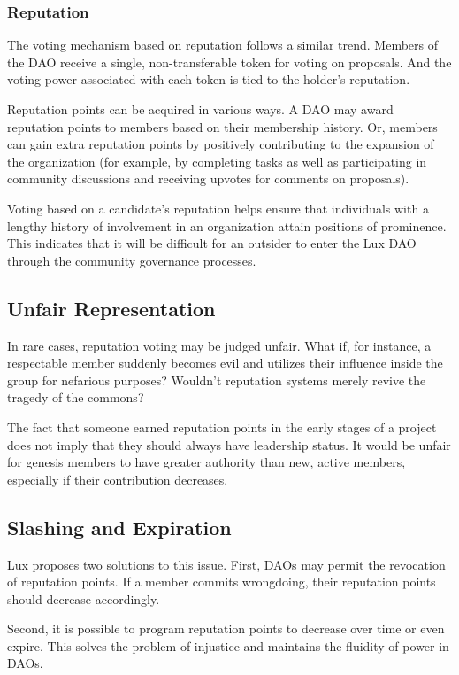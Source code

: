 \documentclass[11pt]{article}
\begin{document}
\subsubsection{Reputation}

The voting mechanism based on reputation follows a similar trend. Members of the DAO receive a single, non-transferable token for voting on proposals. And the voting power associated with each token is tied to the holder's reputation.


Reputation points can be acquired in various ways. A DAO may award reputation points to members based on their membership history. Or, members can gain extra reputation points by positively contributing to the expansion of the organization (for example, by completing tasks as well as participating in community discussions and receiving upvotes for comments on proposals).


Voting based on a candidate's reputation helps ensure that individuals with a lengthy history of involvement in an organization attain positions of prominence. This indicates that it will be difficult for an outsider to enter the Lux DAO through the community governance processes.


\subsection{Unfair Representation}

In rare cases, reputation voting may be judged unfair. What if, for instance, a respectable member suddenly becomes evil and utilizes their influence inside the group for nefarious purposes? Wouldn't reputation systems merely revive the tragedy of the commons?


The fact that someone earned reputation points in the early stages of a project does not imply that they should always have leadership status. It would be unfair for genesis members to have greater authority than new, active members, especially if their contribution decreases.


\subsection{Slashing and Expiration}

Lux proposes two solutions to this issue. First, DAOs may permit the revocation of reputation points. If a member commits wrongdoing, their reputation points should decrease accordingly.


Second, it is possible to program reputation points to decrease over time or even expire. This solves the problem of injustice and maintains the fluidity of power in DAOs.
\end{document}
